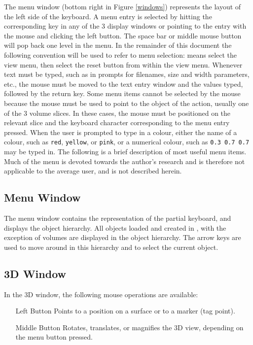 The menu window (bottom right in Figure \ref{windows}) represents the layout
of the left side of the keyboard.  A menu entry is selected by hitting the
corresponding key in any of the 3 display windows or pointing to the entry
with the mouse and clicking the left button.  The space bar or middle mouse
button will pop back one level in the menu.  In the remainder of this document
the following convention will be used to refer to menu selection:
 means select the view menu, then select the reset button
from within the view menu.  Whenever text must be typed, such as in prompts
for filenames, size and width parameters, etc., the mouse must be moved to the
text entry window and the values typed, followed by the return key.
Some menu items cannot be selected by the mouse because the mouse must be
used to point to the object of the action, usually one of the 3 volume slices.
In these cases, the mouse must be positioned on the relevant slice and the
keyboard character corresponding to the menu entry pressed.
When the user is prompted to type in a colour, either the name of a colour,
such as {\tt red}, {\tt yellow}, or {\tt pink}, or a numerical colour,
such as \mbox{\tt 0.3 0.7 0.7} may be typed in.  The following is a brief
description of most useful menu items.  Much of the menu is devoted towards
the author's research and is therefore not applicable to the average 
user, and is not described herein.

\subsection{Menu Window}

The menu window contains the representation of the partial keyboard, and
displays the object hierarchy.  All objects loaded and created in \display,
with the exception of volumes are displayed in the object hierarchy.  The
arrow keys are used to move around in this hierarchy and to select the
current object.

\subsection{3D Window}

In the 3D window, the following mouse operations are available:

\begin{itemize}
\item[Left Button]  Points to a position on a surface or to a marker
                    (tag point).
\item[Middle Button]  Rotates, translates, or magnifies the 3D view, depending
                      on the menu button pressed.
\end{itemize}

